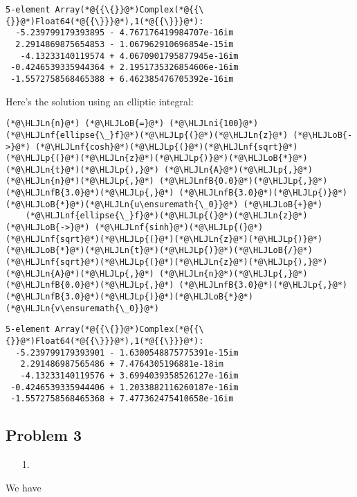 \documentclass[12pt,a4paper]{article}
\newcommand{\HLJLn}[1]{#1}
\newcommand{\HLJLnf}[1]{\textcolor[RGB]{66,102,213}{#1}}
\newcommand{\HLJLnfB}[1]{\textcolor[RGB]{59,151,46}{#1}}
\newcommand{\HLJLni}[1]{\textcolor[RGB]{59,151,46}{#1}}
\newcommand{\HLJLoB}[1]{\textcolor[RGB]{102,102,102}{\textbf{#1}}}
\newcommand{\HLJLp}[1]{#1}
\begin{document}
\begin{lstlisting}
5-element Array(*@{{\{}}@*)Complex(*@{{\{}}@*)Float64(*@{{\}}}@*),1(*@{{\}}}@*):
  -5.239799179393895 - 4.767176419984707e-16im
  2.2914869875654853 - 1.067962910696854e-15im
   -4.13233140119574 + 4.0670901795877945e-16im
 -0.4246539335944364 + 2.1951735326854606e-16im
 -1.5572758568465388 + 6.462385476705392e-16im
\end{lstlisting}


Here's the solution using an elliptic integral:


\begin{lstlisting}
(*@\HLJLn{n}@*) (*@\HLJLoB{=}@*) (*@\HLJLni{100}@*)
(*@\HLJLnf{ellipse{\_}f}@*)(*@\HLJLp{(}@*)(*@\HLJLn{z}@*) (*@\HLJLoB{->}@*) (*@\HLJLnf{cosh}@*)(*@\HLJLp{(}@*)(*@\HLJLnf{sqrt}@*)(*@\HLJLp{(}@*)(*@\HLJLn{z}@*)(*@\HLJLp{)}@*)(*@\HLJLoB{*}@*)(*@\HLJLn{t}@*)(*@\HLJLp{),}@*) (*@\HLJLn{A}@*)(*@\HLJLp{,}@*) (*@\HLJLn{n}@*)(*@\HLJLp{,}@*) (*@\HLJLnfB{0.0}@*)(*@\HLJLp{,}@*) (*@\HLJLnfB{3.0}@*)(*@\HLJLp{,}@*) (*@\HLJLnfB{3.0}@*)(*@\HLJLp{)}@*)(*@\HLJLoB{*}@*)(*@\HLJLn{u\ensuremath{\_0}}@*) (*@\HLJLoB{+}@*)
    (*@\HLJLnf{ellipse{\_}f}@*)(*@\HLJLp{(}@*)(*@\HLJLn{z}@*) (*@\HLJLoB{->}@*) (*@\HLJLnf{sinh}@*)(*@\HLJLp{(}@*)(*@\HLJLnf{sqrt}@*)(*@\HLJLp{(}@*)(*@\HLJLn{z}@*)(*@\HLJLp{)}@*)(*@\HLJLoB{*}@*)(*@\HLJLn{t}@*)(*@\HLJLp{)}@*)(*@\HLJLoB{/}@*)(*@\HLJLnf{sqrt}@*)(*@\HLJLp{(}@*)(*@\HLJLn{z}@*)(*@\HLJLp{),}@*) (*@\HLJLn{A}@*)(*@\HLJLp{,}@*) (*@\HLJLn{n}@*)(*@\HLJLp{,}@*) (*@\HLJLnfB{0.0}@*)(*@\HLJLp{,}@*) (*@\HLJLnfB{3.0}@*)(*@\HLJLp{,}@*) (*@\HLJLnfB{3.0}@*)(*@\HLJLp{)}@*)(*@\HLJLoB{*}@*)(*@\HLJLn{v\ensuremath{\_0}}@*)
\end{lstlisting}

\begin{lstlisting}
5-element Array(*@{{\{}}@*)Complex(*@{{\{}}@*)Float64(*@{{\}}}@*),1(*@{{\}}}@*):
  -5.239799179393901 - 1.6300548875775391e-15im
   2.291486987565486 + 7.4764305196881e-18im
   -4.13233140119576 + 3.6994039358526127e-16im
 -0.4246539335944406 + 1.2033882116260187e-16im
 -1.5572758568465368 + 7.477362475410658e-16im
\end{lstlisting}


\subsection{Problem 3}
\begin{itemize}
\item[1. ] \end{itemize}
We have
\end{document}
